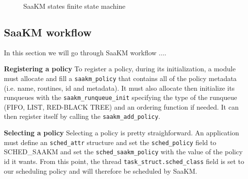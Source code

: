 \begin{figure}[htbp]
        \centering
        
        \caption{SaaKM states finite state machine}
        \label{fig:saakm-states}
\end{figure}




\subsection{SaaKM workflow}

\par In this section we will go through SaaKM workflow ....\newline

\par \textbf{Registering a policy} To register a policy, during its initialization, a module must allocate and fill a \texttt{saakm\_policy} that contains all of the policy metadata (i.e. name, routines, id and metadata). It must also allocate then initialize its runqueues with the \texttt{saakm\_runqueue\_init} specifying the type of the runqueue (FIFO, LIST, RED-BLACK TREE) and an ordering function if needed. It can then register itself by calling the \texttt{saakm\_add\_policy}. \newline

\par \textbf{Selecting a policy} Selecting a policy is pretty straighforward. An application must define an \texttt{sched\_attr} structure and set the \texttt{sched\_policy} field to SCHED\_SAAKM and set the \texttt{sched\_saakm\_policy} with the value of the policy id it wants. From this point, the thread \texttt{task\_struct.sched\_class} field is set to our scheduling policy and will therefore be scheduled by SaaKM. \newline


